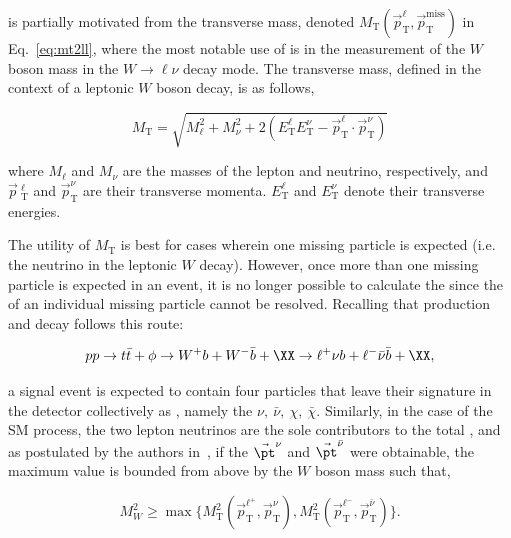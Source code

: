 \mttll is partially motivated from the transverse mass, denoted $M_{\text{T}}\left(\vec{p}^{\ell}_{\text{T}},\vec{p}^{\text{miss}}_{\text{T}}\right)$ in Eq.~\ref{eq:mt2ll}, where the most notable use of \mt is in the measurement of the $W$ boson mass in the $W\rightarrow\ell\nu$ decay mode. The transverse mass, defined in the context of a leptonic $W$ boson decay, is as follows,

\begin{equation}
  M_{\text{T}} = \sqrt{M_{\ell}^{2} + M_{\nu}^{2} + 2(E_{\text{T}}^{\ell}E_{\text{T}}^{\nu} - \vec{p}_{\text{T}}^{\ell}\cdot\vec{p}_{\text{T}}^{\nu})}
\end{equation}

where $M_{\ell}$ and $M_{\nu}$ are the masses of the lepton and neutrino, respectively, and $\vec{p}\
_{\text{T}}^{\ell}$ and $\vec{p}_{\text{T}}^{\nu}$ are their transverse momenta. $E_{\text{T}}^{\ell}$ and $E_{\text{T}}^{\nu}$ denote their transverse energies. 

The utility of $M_{\text{T}}$ is best for cases wherein one missing particle is expected (i.e. the neutrino in the leptonic $W$ decay). However, once more than one missing particle is expected in an event, it is no longer possible to calculate the \mt since the \pt of an individual missing particle cannot be resolved. Recalling that \ttDM production and decay follows this route:

\begin{equation}
pp \rightarrow t\bar{t} + \phi \rightarrow W^{+} b + W^{-} \bar{b} + \XX \rightarrow \ell^{+} \nu b + \ell^{-} \bar{\nu} \bar{b} + \XX,
\end{equation}

a signal event is expected to contain four particles that leave their signature in the detector collectively as \ptmiss, namely the $\nu,\:\bar{\nu},\:\chi,\:\bar{\chi}$. Similarly, in the case of the SM \ttll process, the two lepton neutrinos are the sole contributors to the total \ptvecmiss, and as postulated by the authors in~\cite{Lester:1999tx}, if the $\vec{\pt}^{\nu}$ and $\vec{\pt}^{\bar{\nu}}$ were obtainable, the maximum \mt value is bounded from above by the $W$ boson mass such that,

\begin{equation}
  M_{W}^{2} \geq \max{\{M_{\text{T}}^{2}\left(\vec{p}^{\ell^{+}}_{\text{T}}, \vec{p}^{\nu}_{\text{T}}\right), M_{\text{T}}^{2}\left(\vec{p}^{\ell^{-}}_{\text{T}}, \vec{p}^{\bar{\nu}}_{\text{T}}\right)\}}.
\end{equation} 

